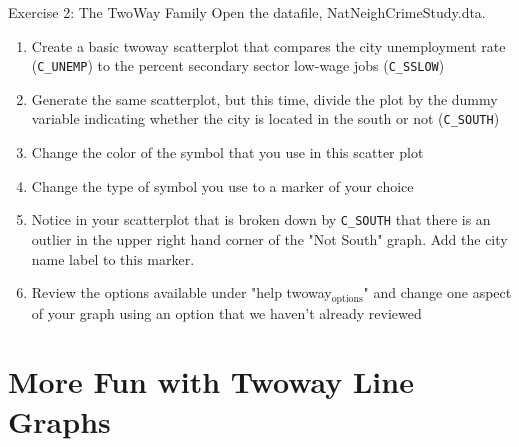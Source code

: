 \documentclass[table,smaller]{beamer}
\begin{document}
\begin{frame}[fragile,label=sec-3-10]{Exercise 2: The TwoWay Family}
 Open the datafile, NatNeighCrimeStudy.dta.
\begin{enumerate}
\item Create a basic twoway scatterplot that compares the city unemployment rate (\texttt{C\_UNEMP}) to the percent secondary sector low-wage jobs (\texttt{C\_SSLOW})
\item Generate the same scatterplot, but this time, divide the plot by the dummy variable indicating whether the city is located in the south or not (\texttt{C\_SOUTH})
\item Change the color of the symbol that you use in this scatter plot
\item Change the type of symbol you use to a marker of your choice
\item Notice in your scatterplot that is broken down by \texttt{C\_SOUTH}  that there is an outlier in the upper right hand corner of the "Not South" graph.  Add the city name label to this marker.
\item Review the options available under "help twoway$_{\text{options}}$" and change one aspect of your graph using an option that we haven’t already reviewed
\end{enumerate}
\end{frame}

\section{More Fun with Twoway Line Graphs}
\label{sec-4}
\end{document}
